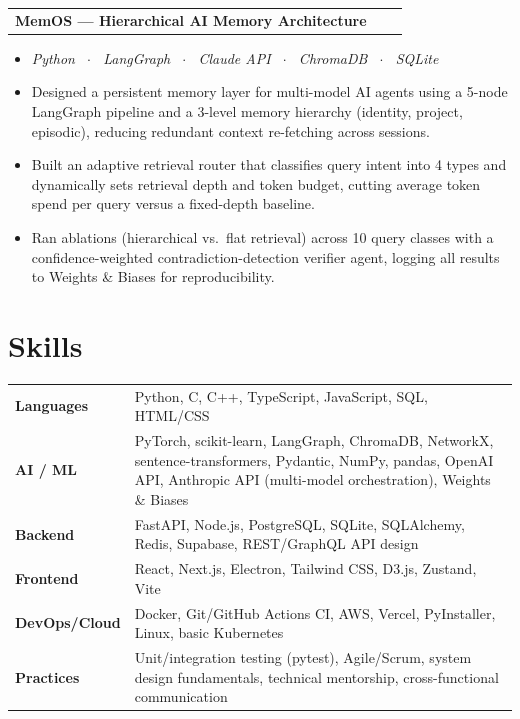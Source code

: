\documentclass[a4paper,10.5pt]{article}
\makeatletter
\newenvironment{project}[3]
    {
    \begin{tabularx}{\linewidth}{@{}l X r@{}}
    \textbf{#1} & \hfill & \href{#2}{\faGithub} \\[0.5pt]
    \end{tabularx}
    \begin{minipage}[t]{\linewidth}
    \begin{itemize}[nosep,after=\strut, leftmargin=1em, itemsep=0.5pt,label=--]
    }
    {
    \end{itemize}
    \end{minipage}
    }
\makeatother
\begin{document}
\begin{project}{MemOS --- Hierarchical AI Memory Architecture}{https://github.com/erfansaffari/memos}{memos}
    \item[] \textit{\small Python \ $\cdot$ \ LangGraph \ $\cdot$ \ Claude API \ $\cdot$ \ ChromaDB \ $\cdot$ \ SQLite} \\[-8pt]
    \item Designed a persistent memory layer for multi-model AI agents using a 5-node LangGraph pipeline and a 3-level memory hierarchy (identity, project, episodic), reducing redundant context re-fetching across sessions.
    \item Built an adaptive retrieval router that classifies query intent into 4 types and dynamically sets retrieval depth and token budget, cutting average token spend per query versus a fixed-depth baseline.
    \item Ran ablations (hierarchical vs.\ flat retrieval) across 10 query classes with a confidence-weighted contradiction-detection verifier agent, logging all results to Weights \& Biases for reproducibility.
\end{project}


\section{Skills}
{\small\begin{tabularx}{\linewidth}{@{}l X@{}}
\textbf{Languages}    & Python, C, C++, TypeScript, JavaScript, SQL, HTML/CSS \\
\textbf{AI / ML}      & PyTorch, scikit-learn, LangGraph, ChromaDB, NetworkX, sentence-transformers, Pydantic, NumPy, pandas, OpenAI API, Anthropic API (multi-model orchestration), Weights \& Biases \\
\textbf{Backend}      & FastAPI, Node.js, PostgreSQL, SQLite, SQLAlchemy, Redis, Supabase, REST/GraphQL API design \\
\textbf{Frontend}     & React, Next.js, Electron, Tailwind CSS, D3.js, Zustand, Vite \\
\textbf{DevOps/Cloud} & Docker, Git/GitHub Actions CI, AWS, Vercel, PyInstaller, Linux, basic Kubernetes \\
\textbf{Practices}    & Unit/integration testing (pytest), Agile/Scrum, system design fundamentals, technical mentorship, cross-functional communication \\
\end{tabularx}}

\vfill
\end{document}
